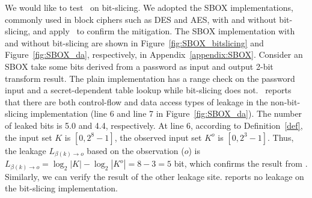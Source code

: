 We would like to test \tool\ on bit-slicing. We adopted the SBOX
implementations, commonly used in block ciphers such as DES and AES, with and
without bit-slicing, and apply \tool\ to confirm the mitigation. The SBOX
implementation with and without bit-slicing are shown in
Figure~\ref{fig:SBOX_bitslicing} and Figure~\ref{fig:SBOX_da}, respectively, in
Appendix~\ref{appendix:SBOX}. Consider an SBOX take some bits derived from a
password as input and output 2-bit transform result. The plain implementation
has a range check on the password input and a secret-dependent table lookup
while bit-slicing does not.
\tool\ reports that there are both control-flow and data access types of leakage
in the non-bit-slicing implementation
(line 6 and line 7 in Figure~\ref{fig:SBOX_da}). The number of leaked bits is
5.0 and 4.4, respectively. At line 6, according to Definition~\ref{def}, the
input set $K$ is $[0,2^8-1]$, the observed input set $K^o$ is $[0,2^3-1]$. Thus,
the leakage $L_{\beta(k)\rightarrow o}$ based on the observation ($o$) is
$L_{\beta(k)\rightarrow o} = \log_2{|K|} - \log_2{|K^o|} = 8-3 = 5$ bit, which
confirms the result from \tool. Similarly, we can verify the result of the other
leakage site. \tool{} reports no leakage on the bit-slicing implementation.

